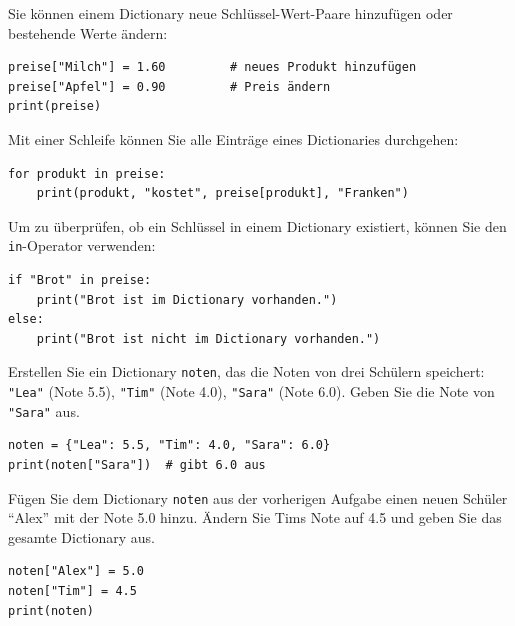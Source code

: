 \begin{myexample}
	Sie können einem Dictionary neue Schlüssel-Wert-Paare hinzufügen oder bestehende Werte ändern:
	\begin{lstlisting}
preise["Milch"] = 1.60         # neues Produkt hinzufügen
preise["Apfel"] = 0.90         # Preis ändern
print(preise)
\end{lstlisting}
\end{myexample}

\begin{myexample}
	Mit einer Schleife können Sie alle Einträge eines Dictionaries durchgehen:
	\begin{lstlisting}
for produkt in preise:
    print(produkt, "kostet", preise[produkt], "Franken")
\end{lstlisting}
\end{myexample}

\begin{myexample}\label{ex:keyExists}
	Um zu überprüfen, ob ein Schlüssel in einem Dictionary existiert, können Sie den \lstinline|in|-Operator verwenden:
	\begin{lstlisting}
if "Brot" in preise:
    print("Brot ist im Dictionary vorhanden.")
else:
    print("Brot ist nicht im Dictionary vorhanden.")
\end{lstlisting}
\end{myexample}

\begin{myexercise}
	Erstellen Sie ein Dictionary \lstinline|noten|, das die Noten von drei Schülern speichert: \lstinline|"Lea"| (Note 5.5), \lstinline|"Tim"| (Note 4.0), \lstinline|"Sara"| (Note 6.0). Geben Sie die Note von \lstinline|"Sara"| aus.

	\begin{myanswer}
		\begin{lstlisting}
noten = {"Lea": 5.5, "Tim": 4.0, "Sara": 6.0}
print(noten["Sara"])  # gibt 6.0 aus
\end{lstlisting}
	\end{myanswer}
\end{myexercise}

\begin{myexercise}
	Fügen Sie dem Dictionary \lstinline|noten| aus der vorherigen Aufgabe einen neuen Schüler \enquote{Alex} mit der Note 5.0 hinzu. Ändern Sie Tims Note auf 4.5 und geben Sie das gesamte Dictionary aus.

	\begin{myanswer}
		\begin{lstlisting}
noten["Alex"] = 5.0
noten["Tim"] = 4.5
print(noten)
\end{lstlisting}
	\end{myanswer}
\end{myexercise}

